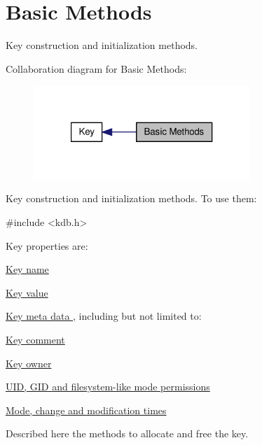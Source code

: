 \hypertarget{group__key__basic}{\section{Basic Methods}
\label{group__key__basic}
}


Key construction and initialization methods.  


Collaboration diagram for Basic Methods\-:
\nopagebreak
\begin{figure}[H]
\begin{center}
\leavevmode
\includegraphics[width=232pt]{group__key__basic}
\end{center}
\end{figure}
Key construction and initialization methods. To use them\-: 
\begin{DoxyCode}
\textcolor{preprocessor}{#include <kdb.h>}
\end{DoxyCode}


Key properties are\-:
\begin{DoxyItemize}
\item \hyperlink{group__keyname}{Key name }
\item \hyperlink{group__keyvalue}{Key value }
\item \hyperlink{group__keymeta}{Key meta data }, including but not limited to\-:
\begin{DoxyItemize}
\item \hyperlink{group__keyvalue_gafb89735689929ff717cc9f2d0d0b46a2}{Key comment }
\item \hyperlink{group__keyname_ga35922a017bee8b4bcb493bbdfad9d6f5}{Key owner }
\item \hyperlink{group__keymeta}{U\-I\-D, G\-I\-D and filesystem-\/like mode permissions }
\item \hyperlink{group__keymeta}{Mode, change and modification times }
\end{DoxyItemize}
\end{DoxyItemize}

Described here the methods to allocate and free the key. 